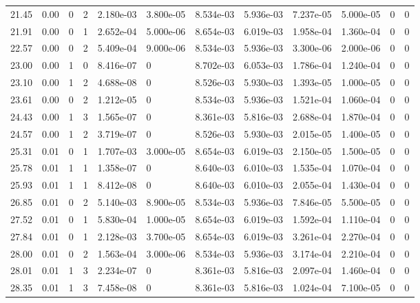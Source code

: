 \documentclass[preview]{standalone}
\begin{document}
{{{\begin{tabular}{L{1.2cm}C{1.2cm} C{0.3cm}C{0.5cm} C{1.4cm}C{1.4cm} C{1.4cm}C{1.4cm} C{1.6cm}C{1.6cm} C{1.6cm}C{1.6cm}}
  21.45  &  0.00  & 0     &  2 &  2.180e-03  & 3.800e-05  &  8.534e-03&   5.936e-03& 7.237e-05 & 5.000e-05   &  0 & 0  \\ 
  21.91  &  0.00  & 0     &  1 &  2.652e-04  & 5.000e-06  &  8.654e-03&   6.019e-03& 1.958e-04 & 1.360e-04   &  0 & 0  \\ 
  22.57  &  0.00  & 0     &  2 &  5.409e-04  & 9.000e-06  &  8.534e-03&   5.936e-03& 3.300e-06 & 2.000e-06   &  0 & 0  \\ 
  23.00  &  0.00  & 1     &  0 &  8.416e-07  & 0  &  8.702e-03&   6.053e-03& 1.786e-04 & 1.240e-04   &  0 & 0  \\ 
  23.10  &  0.00  & 1     &  2 &  4.688e-08  & 0  &  8.526e-03&   5.930e-03& 1.393e-05 & 1.000e-05   &  0 & 0  \\ 
  23.61  &  0.00  & 0     &  2 &  1.212e-05  & 0  &  8.534e-03&   5.936e-03& 1.521e-04 & 1.060e-04   &  0 & 0  \\ 
  24.43  &  0.00  & 1     &  3 &  1.565e-07  & 0  &  8.361e-03&   5.816e-03& 2.688e-04 & 1.870e-04   &  0 & 0  \\ 
  24.57  &  0.00  & 1     &  2 &  3.719e-07  & 0  &  8.526e-03&   5.930e-03& 2.015e-05 & 1.400e-05   &  0 & 0  \\ 
  25.31  &  0.01  & 0     &  1 &  1.707e-03  & 3.000e-05  &  8.654e-03&   6.019e-03& 2.150e-05 & 1.500e-05   &  0 & 0  \\ 
  25.78  &  0.01  & 1     &  1 &  1.358e-07  & 0  &  8.640e-03&   6.010e-03& 1.535e-04 & 1.070e-04   &  0 & 0  \\ 
  25.93  &  0.01  & 1     &  1 &  8.412e-08  & 0  &  8.640e-03&   6.010e-03& 2.055e-04 & 1.430e-04   &  0 & 0  \\ 
  26.85  &  0.01  & 0     &  2 &  5.140e-03  & 8.900e-05  &  8.534e-03&   5.936e-03& 7.846e-05 & 5.500e-05   &  0 & 0  \\ 
  27.52  &  0.01  & 0     &  1 &  5.830e-04  & 1.000e-05  &  8.654e-03&   6.019e-03& 1.592e-04 & 1.110e-04   &  0 & 0  \\ 
  27.84  &  0.01  & 0     &  1 &  2.128e-03  & 3.700e-05  &  8.654e-03&   6.019e-03& 3.261e-04 & 2.270e-04   &  0 & 0  \\ 
  28.00  &  0.01  & 0     &  2 &  1.563e-04  & 3.000e-06  &  8.534e-03&   5.936e-03& 3.174e-04 & 2.210e-04   &  0 & 0  \\ 
  28.01  &  0.01  & 1     &  3 &  2.234e-07  & 0  &  8.361e-03&   5.816e-03& 2.097e-04 & 1.460e-04   &  0 & 0  \\ 
  28.35  &  0.01  & 1     &  3 &  7.458e-08  & 0  &  8.361e-03&   5.816e-03& 1.024e-04 & 7.100e-05   &  0 & 0  \\ 

\end{tabular}}}}
\end{document}
